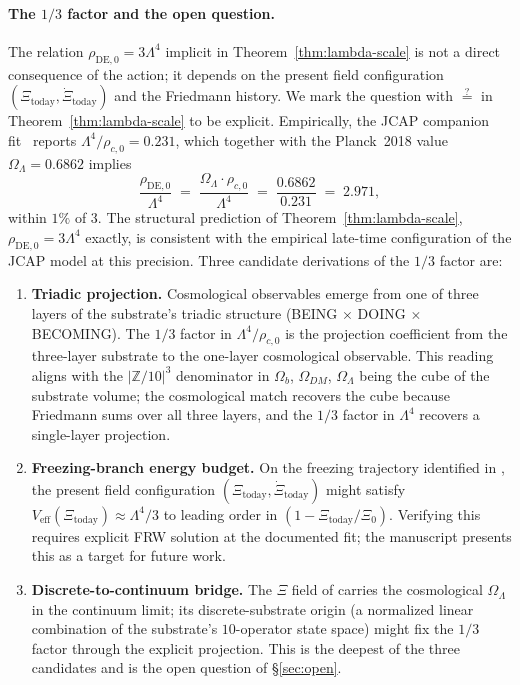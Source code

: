 \documentclass[11pt,reqno]{amsart}
\theoremstyle{plain}
\theoremstyle{definition}
\theoremstyle{remark}
\newcommand{\Z}{\mathbb{Z}}
\begin{document}
\paragraph{The $1/3$ factor and the open question.}
The relation $\rho_\mathrm{DE,0} = 3 \Lambda^{4}$ implicit in
Theorem~\ref{thm:lambda-scale} is not a direct consequence of
the action; it depends on the present field configuration
$(\Xi_\mathrm{today}, \dot\Xi_\mathrm{today})$ and the Friedmann
history. We mark the question with $\stackrel{?}{=}$ in
Theorem~\ref{thm:lambda-scale} to be explicit. Empirically,
the JCAP companion fit~\cite{SandersGish2026JCAP}
reports $\Lambda^{4}/\rho_{c,0} = 0.231$, which together with
the Planck~2018 value $\Omega_\Lambda = 0.6862$ implies
\[
  \frac{\rho_\mathrm{DE,0}}{\Lambda^{4}}
  \;=\; \frac{\Omega_\Lambda \cdot \rho_{c,0}}{\Lambda^{4}}
  \;=\; \frac{0.6862}{0.231}
  \;=\; 2.971,
\]
within $1\%$ of $3$. The structural prediction of
Theorem~\ref{thm:lambda-scale}, $\rho_\mathrm{DE,0} = 3 \Lambda^{4}$
exactly, is consistent with the empirical late-time
configuration of the JCAP model at this precision. Three
candidate derivations of the $1/3$ factor are:

\begin{enumerate}
\item \textbf{Triadic projection.} Cosmological observables
emerge from one of three layers of the substrate's triadic
structure (BEING $\times$ DOING $\times$ BECOMING). The $1/3$
factor in $\Lambda^{4}/\rho_{c,0}$ is the projection coefficient
from the three-layer substrate to the one-layer cosmological
observable. This reading aligns with the $|\Z/10|^{3}$ denominator
in $\Omega_b$, $\Omega_{DM}$, $\Omega_\Lambda$ being the cube of
the substrate volume; the cosmological match recovers the cube
because Friedmann sums over all three layers, and the $1/3$
factor in $\Lambda^{4}$ recovers a single-layer projection.

\item \textbf{Freezing-branch energy budget.} On the freezing
trajectory identified in \cite{SandersGish2026JCAP}, the
present field configuration $(\Xi_\mathrm{today},
\dot\Xi_\mathrm{today})$ might satisfy
$V_\mathrm{eff}(\Xi_\mathrm{today}) \approx \Lambda^{4}/3$ to
leading order in $(1 - \Xi_\mathrm{today}/\Xi_{0})$. Verifying
this requires explicit FRW solution at the documented fit; the
manuscript presents this as a target for future work.

\item \textbf{Discrete-to-continuum bridge.} The $\Xi$ field of
\cite{SandersGish2026JCAP} carries the cosmological
$\Omega_\Lambda$ in the continuum limit; its discrete-substrate
origin (a normalized linear combination of the substrate's
$10$-operator state space) might fix the $1/3$ factor through
the explicit projection. This is the deepest of the three
candidates and is the open question of \S\ref{sec:open}.
\end{enumerate}
\end{document}
